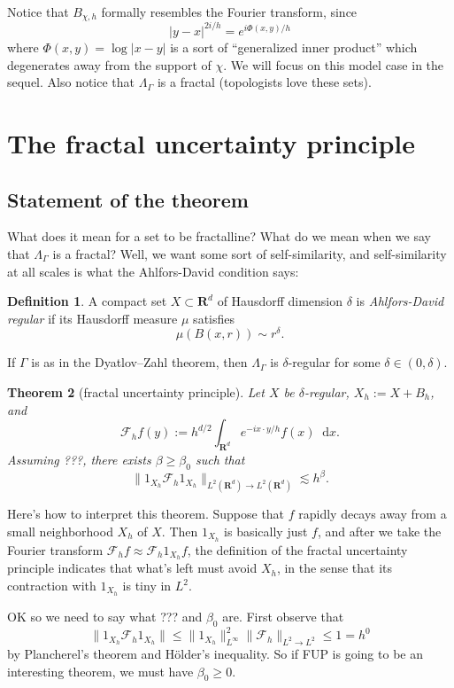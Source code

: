 \documentclass[reqno,12pt]{amsart}
\newcommand{\RR}{\mathbf{R}}
\newcommand*\dif{\mathop{}\!\mathrm{d}}
\newcommand{\dfn}[1]{\emph{#1}\index{#1}}
\newtheorem{theorem}{Theorem}[section]
\theoremstyle{definition}
\newtheorem{definition}[theorem]{Definition}
\numberwithin{equation}{section}
\begin{document}
Notice that $B_{\chi, h}$ formally resembles the Fourier transform, since 
$$|y - x|^{2i/h} = e^{i\Phi(x, y)/h}$$
where $\Phi(x, y) = \log|x - y|$ is a sort of ``generalized inner product'' which degenerates away from the support of $\chi$.
We will focus on this model case in the sequel.
Also notice that $\Lambda_\Gamma$ is a fractal (topologists love these sets).

\section{The fractal uncertainty principle}
\subsection{Statement of the theorem}
What does it mean for a set to be fractalline? What do we mean when we say that $\Lambda_\Gamma$ is a fractal?
Well, we want some sort of self-similarity, and self-similarity at all scales is what the Ahlfors-David condition says:

\begin{definition}
A compact set $X \subset \RR^d$ of Hausdorff dimension $\delta$ is \dfn{Ahlfors-David regular} if its Hausdorff measure $\mu$ satisfies 
$$\mu(B(x, r)) \sim r^\delta.$$
\end{definition}

If $\Gamma$ is as in the Dyatlov--Zahl theorem, then $\Lambda_\Gamma$ is $\delta$-regular for some $\delta \in (0, \delta)$.

\begin{theorem}[fractal uncertainty principle]
    Let $X$ be $\delta$-regular, $X_h := X + B_h$, and
    $$\mathscr F_h f(y) := h^{d/2} \int_{\RR^d} e^{-ix \cdot y/h} f(x) \dif x.$$
    Assuming ???, there exists $\beta \geq \beta_0$ such that 
    $$\|1_{X_h} \mathscr F_h 1_{X_h}\|_{L^2(\RR^d) \to L^2(\RR^d)} \lesssim h^\beta.$$
\end{theorem}

Here's how to interpret this theorem.
Suppose that $f$ rapidly decays away from a small neighborhood $X_h$ of $X$.
Then $1_{X_h}$ is basically just $f$, and after we take the Fourier transform $\mathscr F_h f \approx \mathscr F_h 1_{X_h} f$, the definition of the fractal uncertainty principle indicates that what's left must avoid $X_h$, in the sense that its contraction with $1_{X_h}$ is tiny in $L^2$.

OK so we need to say what ??? and $\beta_0$ are. First observe that 
$$\|1_{X_h} \mathscr F_h 1_{X_h}\| \leq \|1_{X_h}\|_{L^\infty}^2 \|\mathscr F_h\|_{L^2 \to L^2} \leq 1 = h^0$$
by Plancherel's theorem and H\"older's inequality.
So if FUP is going to be an interesting theorem, we must have $\beta_0 \geq 0$.
\end{document}
